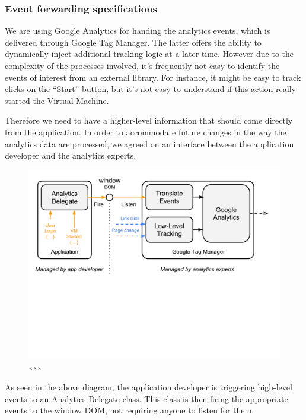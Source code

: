 \documentclass{article}
\begin{document}
\subsubsection{Event forwarding specifications}

We are using Google Analytics for handing the analytics events, which is delivered through Google Tag Manager. The latter offers the ability to dynamically inject additional tracking logic at a later time. However due to the complexity of the processes involved, it’s frequently not easy to identify the events of interest from an external library. For instance, it might be easy to track clicks on the “Start” button, but it’s not easy to understand if this action really started the Virtual Machine.

Therefore we need to have a higher-level information that should come directly from the application. In order to accommodate future changes in the way the analytics data are processed, we agreed on an interface between the application developer and the analytics experts. 


\begin{figure}[t]
  \begin{center}
		\includegraphics[width=\columnwidth]{imgs/CERN60Events.pdf}
  \end{center}
\caption{xxx}
\label{xxx}
\end{figure}



As seen in the above diagram, the application developer is triggering high-level events to an Analytics Delegate class. This class is then firing the appropriate events to the window DOM, not requiring anyone to listen for them.
\end{document}
